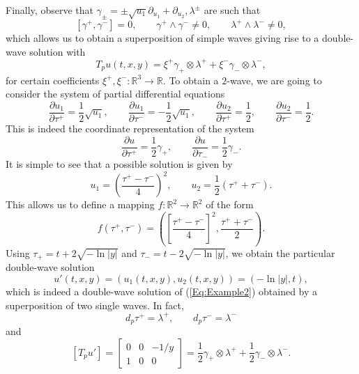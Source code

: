 \documentclass{birkjour}
\theoremstyle{definition}
\theoremstyle{remark}
\numberwithin{equation}{section}
\numberwithin{equation}{section}
\numberwithin{thm}{section}
\numberwithin{equation}{section}
\numberwithin{thm}{section}
\begin{document}
Finally, observe that $\gamma_{\pm}=\pm \sqrt{u_1}\partial_{u_1}+\partial_{u_2},\lambda^{\pm}$ are such that 
$$
[\gamma^+,\gamma^-]=0,\qquad \gamma^+\wedge\gamma^-\neq 0,\qquad \lambda^+\wedge\lambda^-\neq 0,
$$
which allows us to obtain a superposition of simple waves giving rise to a double-wave solution with
$$
T_pu(t,x,y)=\xi^+\gamma_+\otimes \lambda^++\xi^-\gamma_-\otimes \lambda^-,
$$
for certain coefficients $\xi^+,\xi^-:\mathbb{R}^3\rightarrow \mathbb{R}$. 
To obtain a $2$-wave, we are going to consider the system of partial differential equations
$$
\frac{\partial u_1}{\partial \tau^+}=\frac 12\sqrt{u_1},\qquad \frac{\partial u_1}{\partial \tau^-}=-\frac 12\sqrt{u_1},\qquad \frac{\partial u_2}{\partial \tau^+}=\frac 12,\qquad \frac{\partial u_2}{\partial \tau^-}=\frac 12.
$$
This is indeed the coordinate representation of the system
$$
\frac{\partial u}{\partial \tau^+}=\frac 12\gamma_+,\qquad \frac{\partial u}{\partial\tau_-}=\frac 12\gamma_-.
$$
It is simple to see that a possible solution is given by
$$
u_1=\left(\frac{\tau^+-\tau^-}{4}\right)^2,\qquad u_2=\frac 12(\tau^++\tau^-).
$$
This allows us to define a mapping $f:\mathbb{R}^2\rightarrow \mathbb{R}^2$ of the form
$$
f(\tau^+,\tau^-)=\left(\left[\frac{\tau^+-\tau^-}{4}\right]^2,\frac{\tau^++\tau^-}2\right).
$$
Using $\tau_+=t+2\sqrt{-\ln|y|}$ and $\tau_-=t-2\sqrt{-\ln|y|}$, we obtain the particular double-wave solution
$$
u'(t,x,y)=(u_{1}(t,x,y),u_{2}(t,x,y))=(-\ln|y|,t), 
$$
which is indeed a double-wave solution of  (\ref{Eq:Example2}) obtained by a superposition of two single waves. In fact,
$$
d_p\tau^+=\lambda^+,\qquad d_p\tau^-=\lambda^-
$$
and
$$
[T_pu']=\left[ \begin{matrix}  0&0&-1/y\\ 1 &0& 0\end{matrix} \right]=\frac 12\gamma_+\otimes \lambda^++\frac 12 \gamma_-\otimes \lambda^- .
$$



\end{document}
